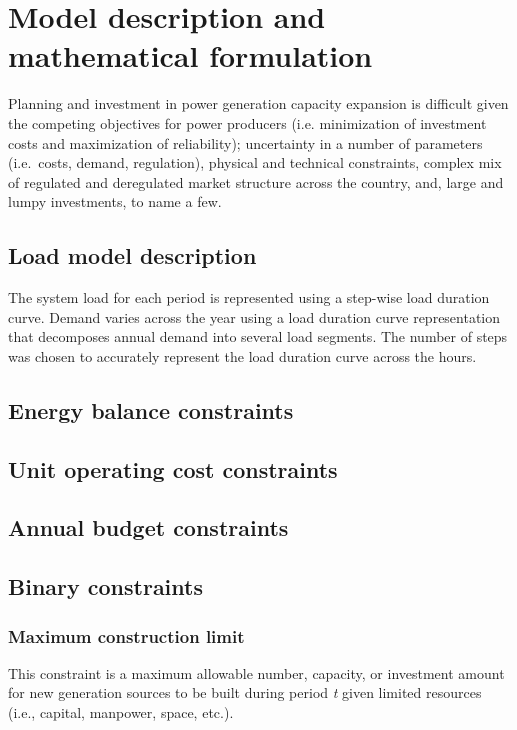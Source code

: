 \documentclass[10pt]{amsart}
\begin{document}
\section{Model description and mathematical formulation}
Planning and investment in power generation capacity expansion is difficult given the competing objectives for power producers (i.e. minimization of investment costs and maximization of reliability); uncertainty in a number of parameters (i.e.\ costs, demand, regulation), physical and technical constraints, complex mix of regulated and deregulated market structure across the country, and, large and lumpy investments, to name a few. 
\subsection{Load model description}
The system load for each period is represented using a step-wise load duration curve. 
Demand varies across the year using a load duration curve representation that decomposes annual demand into several load segments. 
The number of steps was chosen to accurately represent the load duration curve across the hours.
\subsection{Energy balance constraints}
\subsection{Unit operating cost constraints}
\subsection{Annual budget constraints}
\subsection{Binary constraints}
\subsubsection{Maximum construction limit \nopunct}
This constraint is a maximum allowable number, capacity, or investment amount for new generation sources to be built during period \textit{t} given limited resources (i.e., capital, manpower, space, etc.). 
\end{document}
